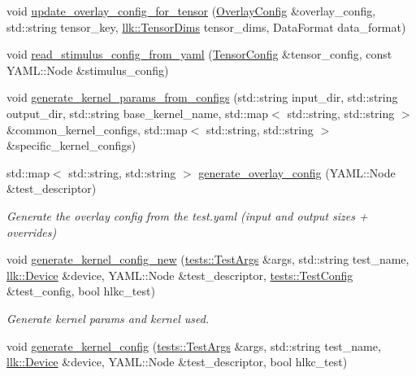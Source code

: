 \begin{DoxyCompactItemize}
\item 
void \hyperlink{namespacetests_aa762ecf88c7b287d4a449b8bfd701d82}{update\+\_\+overlay\+\_\+config\+\_\+for\+\_\+tensor} (\hyperlink{structtests_1_1OverlayConfig}{Overlay\+Config} \&overlay\+\_\+config, std\+::string tensor\+\_\+key, \hyperlink{structllk_1_1TensorDims}{llk\+::\+Tensor\+Dims} tensor\+\_\+dims, Data\+Format data\+\_\+format)
\item 
void \hyperlink{namespacetests_abe44eff5730d1364f1e3091891f544f8}{read\+\_\+stimulus\+\_\+config\+\_\+from\+\_\+yaml} (\hyperlink{structtests_1_1TensorConfig}{Tensor\+Config} \&tensor\+\_\+config, const Y\+A\+M\+L\+::\+Node \&stimulus\+\_\+config)
\item 
void \hyperlink{namespacetests_aeeb1646ef78140c8bd98b26efaacb278}{generate\+\_\+kernel\+\_\+params\+\_\+from\+\_\+configs} (std\+::string input\+\_\+dir, std\+::string output\+\_\+dir, std\+::string base\+\_\+kernel\+\_\+name, std\+::map$<$ std\+::string, std\+::string $>$ \&common\+\_\+kernel\+\_\+configs, std\+::map$<$ std\+::string, std\+::string $>$ \&specific\+\_\+kernel\+\_\+configs)
\item 
std\+::map$<$ std\+::string, std\+::string $>$ \hyperlink{namespacetests_a52d1d4bec489c7f42a6c5fe9250cdbf8}{generate\+\_\+overlay\+\_\+config} (Y\+A\+M\+L\+::\+Node \&test\+\_\+descriptor)
\begin{DoxyCompactList}\small\item\em Generate the overlay config from the test.\+yaml (input and output sizes + overrides) \end{DoxyCompactList}\item 
void \hyperlink{namespacetests_a36b83a1268e91407bb328fc40deb29d8}{generate\+\_\+kernel\+\_\+config\+\_\+new} (\hyperlink{structtests_1_1TestArgs}{tests\+::\+Test\+Args} \&args, std\+::string test\+\_\+name, \hyperlink{classllk_1_1Device}{llk\+::\+Device} \&device, Y\+A\+M\+L\+::\+Node \&test\+\_\+descriptor, \hyperlink{structtests_1_1TestConfig}{tests\+::\+Test\+Config} \&test\+\_\+config, bool hlkc\+\_\+test)
\begin{DoxyCompactList}\small\item\em Generate kernel params and kernel used. \end{DoxyCompactList}\item 
void \hyperlink{namespacetests_a7cec560b495f08abb3831babd2775513}{generate\+\_\+kernel\+\_\+config} (\hyperlink{structtests_1_1TestArgs}{tests\+::\+Test\+Args} \&args, std\+::string test\+\_\+name, \hyperlink{classllk_1_1Device}{llk\+::\+Device} \&device, Y\+A\+M\+L\+::\+Node \&test\+\_\+descriptor, bool hlkc\+\_\+test)

\end{DoxyCompactItemize}
